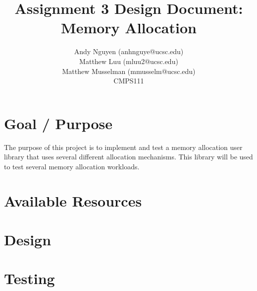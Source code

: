 \documentclass[10pt]{article}
\title{Assignment 3 Design Document: Memory Allocation}
\author{Andy Nguyen (anhnguye@ucsc.edu) \\ Matthew Luu (mluu2@ucsc.edu) \\ Matthew Musselman (mmusselm@ucsc.edu) \\ CMPS111}
\begin{document}
\maketitle

\section{Goal / Purpose}
The purpose of this project is to implement and test a memory allocation user 
library that uses several different allocation mechanisms. This library will be 
used to test several memory allocation workloads.

\section{Available Resources}


\section{Design}

\section{Testing}
\end{document}
